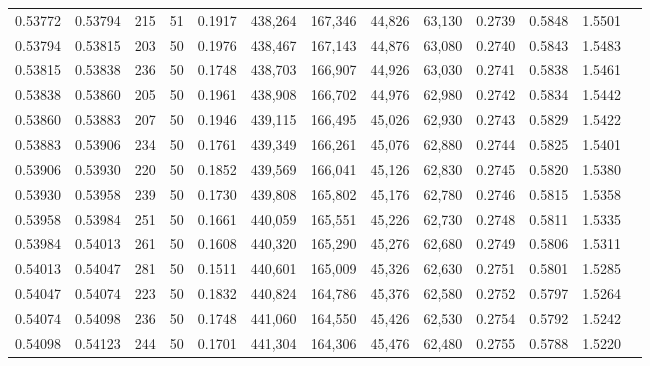 \begin{tabular}{rrrrrrrrrrrrr}
0.53772 & 0.53794 &   215 &  51 &                                     0.1917 & 438,264 & 167,346 &  44,826 &  63,130 & 0.2739 & 0.5848 & 1.5501 \\
0.53794 & 0.53815 &   203 &  50 &                                     0.1976 & 438,467 & 167,143 &  44,876 &  63,080 & 0.2740 & 0.5843 & 1.5483 \\
0.53815 & 0.53838 &   236 &  50 &                                     0.1748 & 438,703 & 166,907 &  44,926 &  63,030 & 0.2741 & 0.5838 & 1.5461 \\
0.53838 & 0.53860 &   205 &  50 &                                     0.1961 & 438,908 & 166,702 &  44,976 &  62,980 & 0.2742 & 0.5834 & 1.5442 \\
0.53860 & 0.53883 &   207 &  50 &                                     0.1946 & 439,115 & 166,495 &  45,026 &  62,930 & 0.2743 & 0.5829 & 1.5422 \\
0.53883 & 0.53906 &   234 &  50 &                                     0.1761 & 439,349 & 166,261 &  45,076 &  62,880 & 0.2744 & 0.5825 & 1.5401 \\
0.53906 & 0.53930 &   220 &  50 &                                     0.1852 & 439,569 & 166,041 &  45,126 &  62,830 & 0.2745 & 0.5820 & 1.5380 \\
0.53930 & 0.53958 &   239 &  50 &                                     0.1730 & 439,808 & 165,802 &  45,176 &  62,780 & 0.2746 & 0.5815 & 1.5358 \\
0.53958 & 0.53984 &   251 &  50 &                                     0.1661 & 440,059 & 165,551 &  45,226 &  62,730 & 0.2748 & 0.5811 & 1.5335 \\
0.53984 & 0.54013 &   261 &  50 &                                     0.1608 & 440,320 & 165,290 &  45,276 &  62,680 & 0.2749 & 0.5806 & 1.5311 \\
0.54013 & 0.54047 &   281 &  50 &                                     0.1511 & 440,601 & 165,009 &  45,326 &  62,630 & 0.2751 & 0.5801 & 1.5285 \\
0.54047 & 0.54074 &   223 &  50 &                                     0.1832 & 440,824 & 164,786 &  45,376 &  62,580 & 0.2752 & 0.5797 & 1.5264 \\
0.54074 & 0.54098 &   236 &  50 &                                     0.1748 & 441,060 & 164,550 &  45,426 &  62,530 & 0.2754 & 0.5792 & 1.5242 \\
0.54098 & 0.54123 &   244 &  50 &                                     0.1701 & 441,304 & 164,306 &  45,476 &  62,480 & 0.2755 & 0.5788 & 1.5220 \\

\end{tabular}
